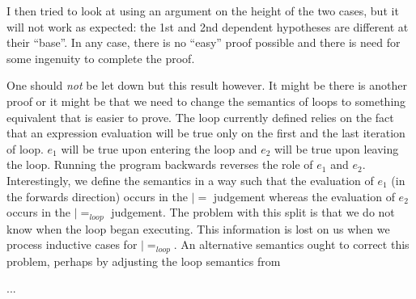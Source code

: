 I then tried to look at using an argument on the height of the two
cases, but it will not work as expected: the 1st and 2nd dependent
hypotheses are different at their ``base''. In any case, there is no
``easy'' proof possible and there is need for some ingenuity to
complete the proof.

One should \emph{not} be let down but this result however. It might be
there is another proof or it might be that we need to change the
semantics of loops to something equivalent that is easier to
prove. The loop currently defined relies on the fact that an
expression evaluation will be true only on the first and the last
iteration of loop. $e_1$ will be true upon entering the loop and $e_2$
will be true upon leaving the loop. Running the program backwards
reverses the role of $e_1$ and $e_2$. Interestingly, we define the
semantics in a way such that the evaluation of $e_1$ (in the forwards
direction) occurs in the $|=$ judgement whereas the evaluation of
$e_2$ occurs in the $|=_{loop}$ judgement. The problem with this split
is that we do not know when the loop began executing. This information
is lost on us when we process inductive cases for $|=_{loop}$. An
alternative semantics ought to correct this problem, perhaps by
adjusting the loop semantics from \cite{glueck+2007}

...

